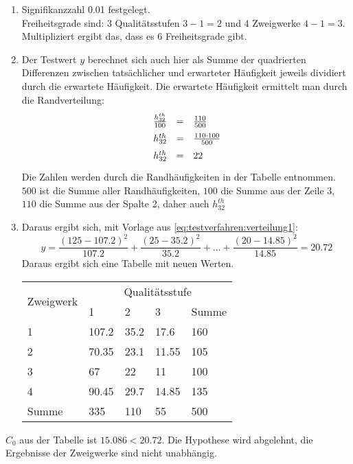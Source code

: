 \begin{enumerate}[label=\arabic* \bfseries Schritt:]
\item Signifikanzzahl 0.01 festgelegt. \\
Freiheitsgrade sind: 3 Qualitätsstufen $3-1=2$ und 4 Zweigwerke $4-1=3$. Multipliziert ergibt das, dass es 6 Freiheitsgrade gibt.
\item Der Testwert $y$ berechnet sich auch hier als Summe der quadrierten Differenzen zwischen tatsächlicher und erwarteter Häufigkeit jeweils dividiert durch die erwartete Häufigkeit. Die erwartete Häufigkeit ermittelt man durch die Randverteilung:
\begin{equation*}
\ra{1.5}
\begin{array}{rcl}
 \frac{h_{32}^{th}}{100}&=&\frac{110}{500}  \\
 h_{32}^{th}&=&\frac{110\cdot100}{500} \\
 h_{32}^{th}&=&22
\end{array}
\end{equation*}
Die Zahlen werden durch die Randhäufigkeiten in der Tabelle entnommen. $500$ ist die Summe aller Randhäufigkeiten, $100$ die Summe aus der Zeile 3, $110$ die Summe aus der Spalte 2, daher auch $h_{32}^{th}$
\item Daraus ergibt sich, mit Vorlage aus \autoref{eq:testverfahren:verteilung1}:
\begin{equation*}
 y=\frac{(125-107.2)^2}{107.2} + \frac{(25-35.2)^2}{35.2}+ \ldots + \frac{(20-14.85)^2}{14.85} = 20.72
\end{equation*}
Daraus ergibt sich eine Tabelle mit neuen Werten.
\begin{table}[htb]
\centering
\begin{tabular}{@{}lllll@{}} \toprule
\multicolumn{1}{c}{\multirow{2}{*}{Zweigwerk}} & \multicolumn{4}{c}{Qualitätsstufe} \\
\multicolumn{1}{c}{} & 1 & 2 & 3 & Summe \\ \midrule
1 & 107.2 & 35.2 & 17.6 & 160 \\
2 & 70.35 & 23.1 & 11.55 & 105 \\
3 & 67 & 22 & 11 & 100 \\
4 & 90.45 & 29.7 & 14.85 & 135 \\
Summe & 335 & 110 & 55 & 500 \\ \bottomrule
\end{tabular}
\end{table}
\end{enumerate}
$C_0$ aus der Tabelle ist $15.086 < 20.72$. Die Hypothese wird abgelehnt, die Ergebnisse der Zweigwerke sind nicht unabhängig.